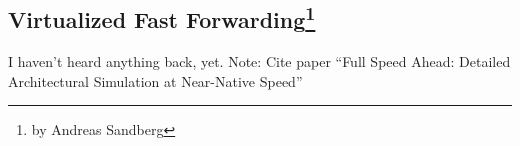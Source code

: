 \subsection[Virtualized Fast Forwarding]{Virtualized Fast Forwarding\footnote{by Andreas Sandberg}}

I haven't heard anything back, yet.
Note: Cite paper ``Full Speed Ahead: Detailed Architectural Simulation at Near-Native Speed''
